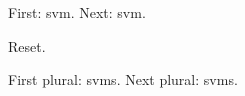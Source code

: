 \documentclass{article}
\begin{document}
First: \gls{svm}. Next: \gls{svm}.

Reset.

First plural: \glspl{svm}. Next plural: \glspl{svm}.

\printunsrtglossaries
\end{document}
